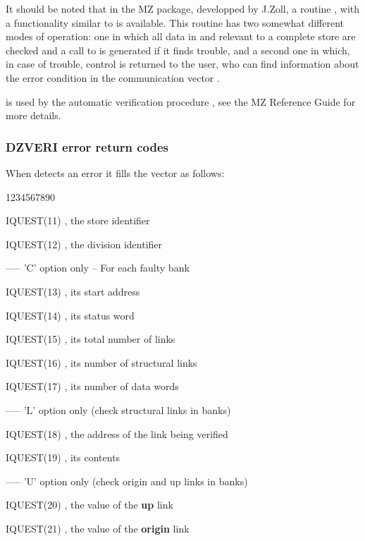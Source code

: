 It should be noted that in the MZ package, developped by J.Zoll, a routine
, with a functionality similar to  is available. 
This routine has two somewhat different modes of operation:
one in which all data in and relevant to a complete
store are checked and a call to  is generated if it finds trouble,
and a second one in which, in case of trouble, control is returned to the user,
who can find information about the error condition in the communication vector
\IQUEST.

 is used by the automatic verification procedure
, see the MZ Reference Guide for more details.

\newpage

\subsubsection*{DZVERI error return codes}
When  detects an error it fills the
\IQUEST{} vector as follows:
\begin{DLtt}{1234567890}
\item[IQUEST(11)], the store identifier
\item[IQUEST(12)], the division identifier
\par
\item[ -----  'C' {\rm option only -- For each faulty bank}]
\par
\item[IQUEST(13)], its start address
\item[IQUEST(14)], its status word
\item[IQUEST(15)], its total number of links
\item[IQUEST(16)], its number of structural links
\item[IQUEST(17)], its number of data words
\par
\item[ ----- 'L' {\rm option only (check structural links in banks)}]
\par
\item[IQUEST(18)], the address of the link being verified
\item[IQUEST(19)], its contents
\par
\item[ ----- 'U' {\rm option only (check origin and up links in banks)}]
\par
\item[IQUEST(20)], the value of the {\bf up} link
\item[IQUEST(21)], the value of the {\bf origin} link
\end{DLtt}

